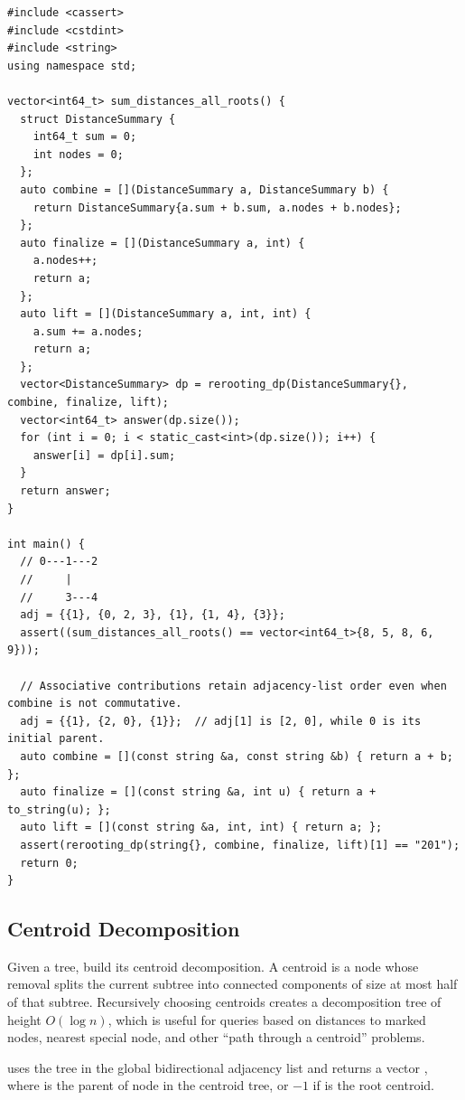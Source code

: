 \begin{lstlisting}[style=cpp]
#include <cassert>
#include <cstdint>
#include <string>
using namespace std;

vector<int64_t> sum_distances_all_roots() {
  struct DistanceSummary {
    int64_t sum = 0;
    int nodes = 0;
  };
  auto combine = [](DistanceSummary a, DistanceSummary b) {
    return DistanceSummary{a.sum + b.sum, a.nodes + b.nodes};
  };
  auto finalize = [](DistanceSummary a, int) {
    a.nodes++;
    return a;
  };
  auto lift = [](DistanceSummary a, int, int) {
    a.sum += a.nodes;
    return a;
  };
  vector<DistanceSummary> dp = rerooting_dp(DistanceSummary{}, combine, finalize, lift);
  vector<int64_t> answer(dp.size());
  for (int i = 0; i < static_cast<int>(dp.size()); i++) {
    answer[i] = dp[i].sum;
  }
  return answer;
}

int main() {
  // 0---1---2
  //     |
  //     3---4
  adj = {{1}, {0, 2, 3}, {1}, {1, 4}, {3}};
  assert((sum_distances_all_roots() == vector<int64_t>{8, 5, 8, 6, 9}));

  // Associative contributions retain adjacency-list order even when combine is not commutative.
  adj = {{1}, {2, 0}, {1}};  // adj[1] is [2, 0], while 0 is its initial parent.
  auto combine = [](const string &a, const string &b) { return a + b; };
  auto finalize = [](const string &a, int u) { return a + to_string(u); };
  auto lift = [](const string &a, int, int) { return a; };
  assert(rerooting_dp(string{}, combine, finalize, lift)[1] == "201");
  return 0;
}
\end{lstlisting}
\subsection{Centroid Decomposition}
\label{sec:4.1.7}
Given a tree, build its centroid decomposition. A centroid is a node whose removal splits the current subtree into connected components of size at most half of that subtree. Recursively choosing centroids creates a decomposition tree of height $O(\log n)$, which is useful for queries based on distances to marked nodes, nearest special node, and other ``path through a centroid'' problems.

\begin{compactitem}
  \item {} uses the tree in the global bidirectional adjacency list  and returns a vector , where  is the parent of node  in the centroid tree, or $-1$ if  is the root centroid.
\end{compactitem}

